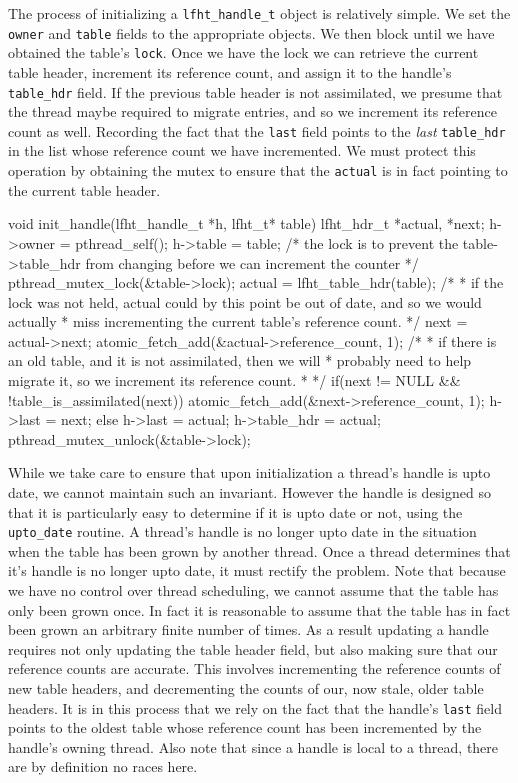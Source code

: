The process of initializing a \texttt{lfht\_handle\_t} object is relatively simple.
We set the \texttt{owner} and  \texttt{table} fields to the appropriate objects.
We then block until we have obtained the table's \texttt{lock}. Once we have the lock
we can retrieve the current table header, increment its reference count, and
assign it to the handle's \texttt{table\_hdr} field. If the previous table header
is not assimilated, we presume that the thread maybe required to migrate entries,
and so we increment its reference count as well. Recording the fact that
the \texttt{last} field points to the {\em last}  \texttt{table\_hdr} in the list
whose reference count we have incremented.
We must protect this operation by obtaining the mutex to ensure that the \texttt{actual}
is in fact pointing to the current table header.


\begin{center}
\begin{clisting}
void init_handle(lfht_handle_t *h, lfht_t* table){
  lfht_hdr_t *actual, *next;
  h->owner = pthread_self();
  h->table = table;
  /* the lock is to prevent the table->table_hdr from changing before we can increment the counter */
  pthread_mutex_lock(&table->lock);
  actual = lfht_table_hdr(table);
  /*
   * if the lock was not held, actual could by this point be out of date, and so we would actually
   * miss incrementing the current table's reference count.
   */
  next = actual->next;
  atomic_fetch_add(&actual->reference_count, 1);
  /* 
   * if there is an old table, and it is not assimilated, then we will
   * probably need to help migrate it, so we increment its reference count.
   *
   */
  if(next != NULL && !table_is_assimilated(next)){
    atomic_fetch_add(&next->reference_count, 1);
    h->last = next;
  } else {
    h->last = actual;
  }
  h->table_hdr = actual;
  pthread_mutex_unlock(&table->lock);
}
\end{clisting}
\end{center}

While we take care to ensure that upon initialization a thread's handle is upto date,
we cannot maintain such an invariant. However the handle is designed so that it is particularly
easy to determine if it is upto date or not, using the  \texttt{upto\_date} routine.
A thread's handle is no longer upto date in the situation when the table has been grown by another thread.
Once a thread determines that it's handle is no longer upto date, it must rectify the problem.
Note that because we have no control over thread scheduling, we cannot assume that
the table has only been grown once. In fact it is reasonable to assume that the table
has in fact been grown an arbitrary finite number of times. As a result updating
a handle requires not only updating the table header field, but also making sure
that our reference counts are accurate. This involves incrementing the reference counts
of new table headers, and decrementing the counts of our, now stale, older table headers.
It is in this process that we rely on the fact that the handle's \texttt{last} field
points to the oldest table whose reference count has been incremented by the handle's owning thread.
Also note that since a handle is local to a thread, there are by definition no races here.

